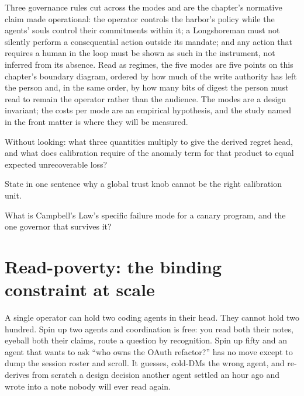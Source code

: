 \documentclass[11pt,a4paper]{article}
\theoremstyle{definition}
\theoremstyle{plain}
\begin{document}
Three governance rules cut across the modes and are the chapter's normative
claim made operational: the operator controls the harbor's policy while the
agents' souls control their commitments within it; a Longshoreman must not
silently perform a consequential action outside its mandate; and any action
that requires a human in the loop must be shown as such in the instrument, not
inferred from its absence. Read as regimes, the five modes are five points on
this chapter's boundary diagram, ordered by how much of the write authority
has left the person and, in the same order, by how many bits of digest the
person must read to remain the operator rather than the audience. The modes
are a design invariant; the costs per mode are an empirical hypothesis, and
the study named in the front matter is where they will be measured.

\pdexercisepointer*{\ref{ex:ls-sdt-limits}}{\ref{ex:ls-freeze-probe-study}}{\pageref{ex:ls-sdt-limits}}

\begin{pdrecitation}
\item Without looking: what three quantities multiply to give the derived regret head, and what does calibration require of the anomaly term for that product to equal expected unrecoverable loss?
\item State in one sentence why a global trust knob cannot be the right calibration unit.
\item What is Campbell's Law's specific failure mode for a canary program, and the one governor that survives it?
\end{pdrecitation}



\section{Read-poverty: the binding constraint at scale}\label{sec:readpoverty}

%
A single operator can hold two coding agents in their head. They cannot hold two
hundred. Spin up two agents and coordination is free: you read both their notes,
eyeball both their claims, route a question by recognition. Spin up fifty and an
agent that wants to ask ``who owns the OAuth refactor?'' has no move except to dump
the session roster and scroll. It guesses, cold-DMs the wrong agent, and re-derives
from scratch a design decision another agent settled an hour ago and wrote into a
note nobody will ever read again.
\end{document}
